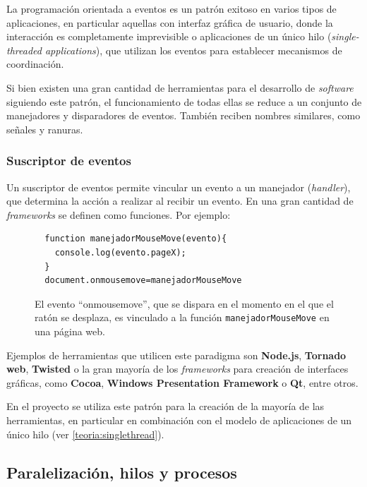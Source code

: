 La programación orientada a eventos es un patrón exitoso en varios tipos de aplicaciones, en particular aquellas con interfaz gráfica de usuario, donde la interacción es completamente imprevisible o aplicaciones de un único hilo (\textit{single-threaded applications}), que utilizan los eventos para establecer mecanismos de coordinación. 

Si bien existen una gran cantidad de herramientas para el desarrollo de \textit{software} siguiendo este patrón, el funcionamiento de todas ellas se reduce a un conjunto de manejadores y disparadores de eventos. También reciben nombres similares, como señales y ranuras.

\subsubsection{Suscriptor de eventos}

Un suscriptor de eventos permite vincular un evento a un manejador (\textit{handler}), que determina la acción a realizar al recibir un evento. En una gran cantidad de \textit{frameworks} se definen como funciones. Por ejemplo:

\begin{figure}[H]
\centering
  \begin{lstlisting}
  function manejadorMouseMove(evento){
    console.log(evento.pageX);
  }
  document.onmousemove=manejadorMouseMove
  \end{lstlisting}
\caption[Evento y manejador]{El evento ``onmousemove'', que se dispara en el momento en el que el ratón se desplaza, es vinculado a la función \texttt{manejadorMouseMove} en una página web.}
\end{figure}

Ejemplos de herramientas que utilicen este paradigma son \textbf{Node.js}, \textbf{Tornado web}, \textbf{Twisted} o la gran mayoría de los \textit{frameworks} para creación de interfaces gráficas, como \textbf{Cocoa}, \textbf{Windows Presentation Framework} o \textbf{Qt}, entre otros.

En el proyecto se utiliza este patrón para la creación de la mayoría de las herramientas, en particular en combinación con el modelo de aplicaciones de un único hilo (ver \ref{teoria:singlethread}).

\subsection{Paralelización, hilos y procesos}

